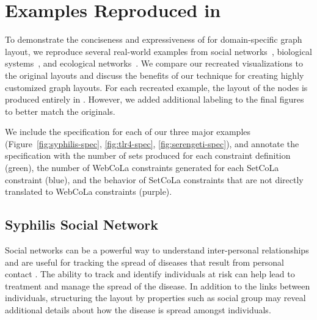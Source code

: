 \section{Examples Reproduced in \projectname}
\label{sec:examples}

To demonstrate the conciseness and expressiveness of \projectname for domain-specific
graph layout, we reproduce several real-world examples from social 
networks~\cite{rothenberg1998using}, biological systems~\cite{barsky2008cerebral}, 
and ecological networks~\cite{kruger2017,baskerville2011spatial}. 
We compare our recreated visualizations to the original layouts and 
discuss the benefits of our technique for creating highly customized graph layouts.
For each recreated example, the layout of the nodes is produced
entirely in \projectname. However, we added additional labeling to the 
final figures to better match the originals.

We include the specification for each of our three major examples 
(Figure~\ref{fig:syphilis-spec}, \ref{fig:tlr4-spec}, \ref{fig:serengeti-spec}),
and annotate the specification with the number of sets produced for each 
constraint definition (green), the number of WebCoLa constraints generated
for each SetCoLa constraint (blue), and the behavior of SetCoLa constraints
that are not directly translated to WebCoLa constraints (purple).


\subsection{Syphilis Social Network}
\tlrfourSpec

Social networks can be a powerful way to understand inter-personal
relationships and are useful for tracking the spread of diseases that
result from personal contact \cite{rothenberg1998using,fitzpatrick2001preventable,mcelroy2003network,fu2011hiv}.
The ability to track and identify individuals at risk can help
lead to treatment and manage the spread of the disease. In
addition to the links between individuals, structuring the layout by
properties such as social group may reveal additional details about
how the disease is spread amongst individuals.

